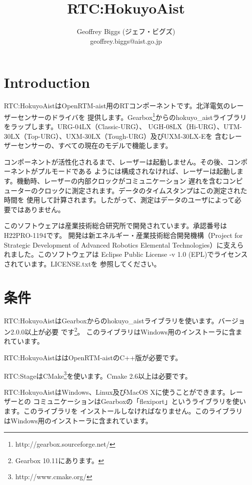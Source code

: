\documentclass[a4paper,10pt]{article}
\title{RTC:HokuyoAist}
\author{Geoffrey Biggs (ジェフ・ビグズ)\\
geoffrey.biggs@aist.go.jp}
\newenvironment{Japanese}{%
  \CJKfamily{min}%
  \CJKtilde
  \CJKnospace}{}
\begin{document}
\begin{CJK}{UTF8}{}
\begin{Japanese}

\maketitle

\section{Introduction}
\label{sec:intro}

RTC:HokuyoAistはOpenRTM-aist用のRTコンポーネントです。北洋電気のレーザーセンサーのドライバを
提供します。Gearbox\footnote{http://gearbox.sourceforge.net/}からのhokuyo\_aistライブラリをラップします。URG-04LX（Classic-URG）、
UGH-08LX（Hi-URG）、UTM-30LX（Top-URG）、UXM-30LX（Tough-URG）及びUXM-30LX-Eを
含むレーザーセンサーの、すべての現在のモデルで機能します。

コンポーネントが活性化されるまで、レーザーは起動しません。その後、コンポーネントがプルモードである
ようには構成されなければ、レーザーは起動します。機動時、レーザーの内部クロックがコミュニケーション
遅れを含むコンピューターのクロックに測定されます。データのタイムスタンプはこの測定された時間を
使用して計算されます。したがって、測定はデータのユーザによって必要ではありません。

このソフトウェアは産業技術総合研究所で開発されています。承認番号はH22PRO-1194です。
開発は新エネルギー・産業技術総合開発機構（Project for Strategic Development of Advanced
Robotics Elemental Technologies）に支えられました。このソフトウェアは
Eclipse Public License -v 1.0 (EPL)でライセンスされています。LICENSE.txtを
参照してください。

\section{条件}
\label{sec:requirements}

RTC:HokuyoAistはGearboxからのhokuyo\_aistライブラリを使います。バージョン2.0.0以上が必要
です\footnote{Gearbox 10.11にあります。}。
このライブラリはWindows用のインストーラに含まれています。

RTC:HokuyoAistははOpenRTM-aistのC++版が必要です。

RTC:StageはCMake\footnote{http://www.cmake.org/}を使います。Cmake
2.6以上は必要です。

RTC:HokuyoAistはWindows、Linux及びMacOS Xに使うことができます。レーザーとの
コミュニケーションはGearboxの「flexiport」というライブラリを使います。このライブラリを
インストールしなければなりません。このライブラリはWindows用のインストーラに含まれています。


\end{Japanese}
\end{CJK}
\end{document}
